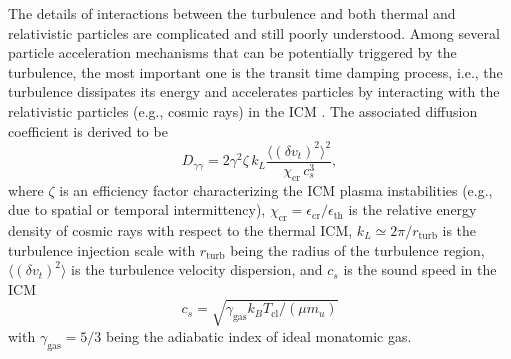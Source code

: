 \documentclass[twocolumn]{aastex62}
\newcommand{\R}[1]{\mathrm{#1}}
\begin{document}
The details of interactions between the turbulence and both thermal and
relativistic particles are complicated and still poorly understood.
Among several particle acceleration mechanisms that can be potentially
triggered by the turbulence, the most important one is the transit time
damping process, i.e., the turbulence dissipates its energy and
accelerates particles by interacting with the relativistic particles
(e.g., cosmic rays) in the ICM
\citep[and references therein]{brunetti2007,brunetti2011}.
The associated diffusion coefficient is derived to be
\citep{miniati2015,pinzke2017}
\begin{equation}
  \label{eq:dpp}
  D_{\gamma\gamma} = 2 \gamma^2 \zeta \,k_L
    \frac{\langle (\delta v_t)^2 \rangle^2}{\chi_{\R{cr}} \, c_s^3},
\end{equation}
where
$\zeta$ is an efficiency factor characterizing the ICM plasma instabilities
(e.g., due to spatial or temporal intermittency),
$\chi_{\R{cr}} = \epsilon_{\R{cr}} / \epsilon_{\R{th}}$ is the relative
energy density of cosmic rays with respect to the thermal ICM,
$k_L \simeq 2\pi / r_{\R{turb}}$ is the turbulence injection scale
with $r_{\R{turb}}$ being the radius of the turbulence region,
$\langle (\delta v_t)^2 \rangle$ is the turbulence velocity dispersion,
and $c_s$ is the sound speed in the ICM
\begin{equation}
  \label{eq:sound-speed}
  c_s = \sqrt{\gamma_{\R{gas}} k_B T_{\R{cl}} / (\mu m_u)}
\end{equation}
with $\gamma_{\R{gas}} = 5/3$ being the adiabatic index
of ideal monatomic gas.
\end{document}
